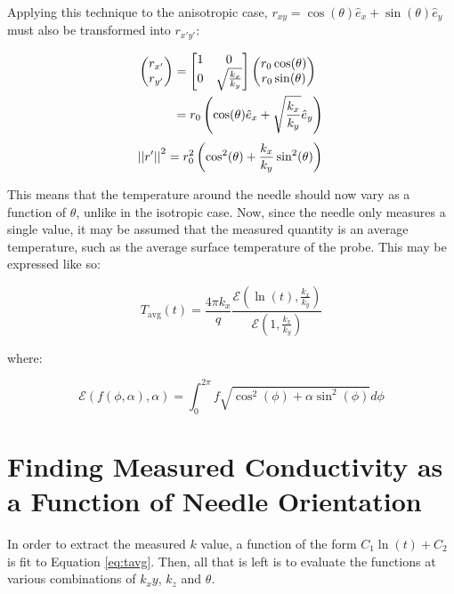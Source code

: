 Applying this technique to the anisotropic case, \(r_{xy} = \cos(\theta) \hat{e}_x + \sin(\theta) \hat{e}_y \) must also be transformed
into \(r_{x'y'}\):

\begin{align*}
    \begin{pmatrix}r_{x'} \\ r_{y'}\end{pmatrix} &=
    \begin{bmatrix}1 & 0\\ 0 & \sqrt{\frac{k_x}{k_y}} \end{bmatrix}\begin{pmatrix}r_0\cos(\theta) \\ r_0\sin(\theta)\end{pmatrix}\\
    &= r_0\left(\cos(\theta) \hat{e}_x + \sqrt{\frac{k_x}{k_y}} \hat{e}_y \right)\\
\end{align*}
\begin{equation}
    \left|\left|{r'}\right|\right|^2 = r_0^2 \left(\cos^2(\theta) + \frac{k_x}{k_y}\sin^2(\theta) \right)\\
\end{equation}

This means that the temperature around the needle should now vary as a function
of \(\theta\), unlike in the isotropic case. Now, since the needle only measures
a single value, it may be assumed that the measured quantity is an
average temperature, such as the average surface temperature of the probe.  This
may be expressed like so:

\begin{equation}
\label{eq:tavg}
T_{\textrm{avg}}(t) = \frac{4\pi k_x}{q} \frac{\mathcal{E}(\ln(t), \frac{k_x}{k_y})}{\mathcal{E}(1, \frac{k_x}{k_y})}
\end{equation}

where:

\begin{equation}
\mathcal{E}(f(\phi, \alpha), \alpha) = \int_0^{2\pi} f\sqrt{\cos^2(\phi) + \alpha\sin^2(\phi)} d\phi
\end{equation}

\section{Finding Measured Conductivity as a Function of Needle Orientation}

In order to extract the measured \(k\) value, a function of the form
\(C_1 \ln(t) + C_2\) is fit to Equation \ref{eq:tavg}. Then, all that is left is to evaluate the functions at various combinations of
\(k_xy\), \(k_z\) and \(\theta\).

